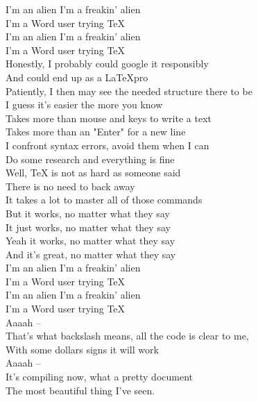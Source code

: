 \documentclass[11pt,a5paper]{article}
\begin{document}
			I’m an alien I’m a freakin’ alien \\
			I’m a Word user trying \TeX \\
			I’m an alien I’m a freakin’ alien \\
			I’m a Word user trying \TeX \\
			
			Honestly, I probably could google it responsibly \\
			And could end up as a \LaTeX pro \\
			Patiently, I then may see the needed structure there to be \\
			I guess it's easier the more you know \\
			
			Takes more than mouse and keys to write a text \\
			Takes more than an "Enter" for a new line \\
			I confront syntax errors, avoid them when I can \\
			Do some research and everything is fine \\
			
			Well, TeX is not as hard as someone said \\
			There is no need to back away \\
			It takes a lot to master all of those commands \\
			But it works, no matter what they say \\
			It just works, no matter what they say \\
			Yeah it works, no matter what they say \\
			And it’s great, no matter what they say \\
			
			I’m an alien I’m a freakin’ alien \\
			I’m a Word user trying \TeX \\
			I’m an alien I’m a freakin’ alien \\
			I’m a Word user trying \TeX \\
			
			Aaaah – \\
			That’s what backslash means, all the code is clear to me, \\
			With some dollars signs it will work \\
			Aaaah – \\
			It’s compiling now, what a pretty document \\
			The most beautiful thing I’ve seen. \\
			
\end{document}
